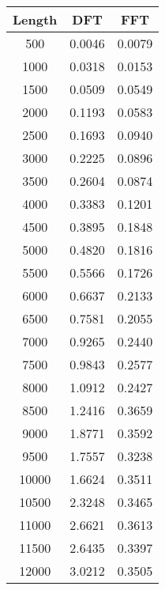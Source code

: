 \begin{tabular}{|c|c|c|}
\hline
Length & DFT & FFT \\
\hline
500 & 0.0046 & 0.0079 \\
1000 & 0.0318 & 0.0153 \\
1500 & 0.0509 & 0.0549 \\
2000 & 0.1193 & 0.0583 \\
2500 & 0.1693 & 0.0940 \\
3000 & 0.2225 & 0.0896 \\
3500 & 0.2604 & 0.0874 \\
4000 & 0.3383 & 0.1201 \\
4500 & 0.3895 & 0.1848 \\
5000 & 0.4820 & 0.1816 \\
5500 & 0.5566 & 0.1726 \\
6000 & 0.6637 & 0.2133 \\
6500 & 0.7581 & 0.2055 \\
7000 & 0.9265 & 0.2440 \\
7500 & 0.9843 & 0.2577 \\
8000 & 1.0912 & 0.2427 \\
8500 & 1.2416 & 0.3659 \\
9000 & 1.8771 & 0.3592 \\
9500 & 1.7557 & 0.3238 \\
10000 & 1.6624 & 0.3511 \\
10500 & 2.3248 & 0.3465 \\
11000 & 2.6621 & 0.3613 \\
11500 & 2.6435 & 0.3397 \\
12000 & 3.0212 & 0.3505 \\
\hline
\end{tabular}
